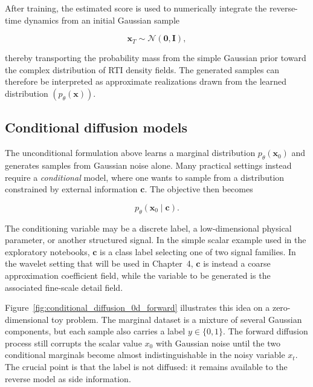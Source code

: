 After training, the estimated score is used to numerically integrate the reverse-time dynamics from an initial Gaussian sample

\begin{equation}
\mathbf{x}_T
\sim
\mathcal{N}(\mathbf{0},\mathbf{I}),
\end{equation}

thereby transporting the probability mass from the simple Gaussian prior toward the complex distribution of RTI density fields. The generated samples can therefore be interpreted as approximate realizations drawn from the learned distribution $(p_{\theta}(\mathbf{x}))$.


\subsection{Conditional diffusion models}

The unconditional formulation above learns a marginal distribution
$p_{\theta}(\mathbf{x}_0)$ and generates samples from Gaussian noise alone.
Many practical settings instead require a \emph{conditional} model, where one
wants to sample from a distribution constrained by external information
$\mathbf{c}$. The objective then becomes

\begin{equation}
    p_{\theta}(\mathbf{x}_0 \mid \mathbf{c}).
\end{equation}

The conditioning variable may be a discrete label, a low-dimensional physical
parameter, or another structured signal. In the simple scalar example used in
the exploratory notebooks, $\mathbf{c}$ is a class label selecting one of two
signal families. In the wavelet setting that will be used in Chapter~4,
$\mathbf{c}$ is instead a coarse approximation coefficient field, while the
variable to be generated is the associated fine-scale detail field.

Figure~\ref{fig:conditional_diffusion_0d_forward} illustrates this idea on a
zero-dimensional toy problem. The marginal dataset is a mixture of several
Gaussian components, but each sample also carries a label $y\in\{0,1\}$. The
forward diffusion process still corrupts the scalar value $x_0$ with Gaussian
noise until the two conditional marginals become almost indistinguishable in
the noisy variable $x_t$. The crucial point is that the label is not diffused:
it remains available to the reverse model as side information.

